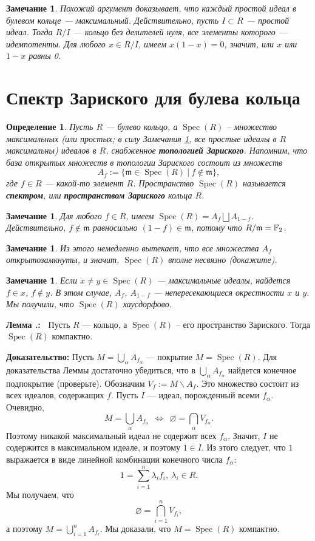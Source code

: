 \documentclass[12pt]{book}
\def\endproof{\hbox{\vrule width 5pt height 5pt depth 0pt}}
\renewcommand{\emptyset}{\varnothing}
\newcommand{\Spec}{\operatorname{Spec}}
\theoremstyle{upshape}
\newtheorem{zadacha}{Задача}[chapter]
\theoremstyle{generic}
\newtheorem{opredelenie}[teorema]{Определение}
\newtheorem{remark}[teorema]{Замечание}
\def\замечание{\begin{remark}}
\def\еза{\end{remark}}
\theoremstyle{upshapenonumber}
\newcommand{\следствие}{%
     \refstepcounter{teorema}
     {\noindent\bf Следствие \thechapter.\arabic{teorema}:\ }}
\newcommand{\пример}{%
     \refstepcounter{teorema}
     {\noindent\bf Пример \thechapter.\arabic{teorema}:\ }}
\newcommand{\лемма}{%
     \refstepcounter{teorema}
     {\noindent\bf Лемма \thechapter.\arabic{teorema}:\ }}
\newcommand{\теорема}{%
     \refstepcounter{teorema}
     {\noindent\bf Теорема \thechapter.\arabic{teorema}:\ }}
\newcommand{\утверждение}{%
     \refstepcounter{teorema}
     {\noindent\bf Утверждение \thechapter.\arabic{teorema}:\ }}
\def\хфилл{\hfill}
\def\ноиндент{\noindent}
\def\бф{\bf}
\def\ем{\em}
\def\задача{\begin{zadacha}}
\def\ез{\end{zadacha}}
\def\еу{\end{ukazanie}}
\def\определение{\begin{opredelenie}}
\def\ео{\end{opredelenie}}
\def\goth{\mathfrak}
\def\енум{\begin{enumerate}}
\def\ее{\end{enumerate}}
\begin{document}
\замечание\label{_prostye_maks_v_bul_Zamechanie_}
Похожий аргумент доказывает, что 
каждый простой идеал в булевом кольце --- максимальный.
Действительно, пусть $I\subset R$ --- простой идеал.
Тогда $R/I$ --- кольцо без делителей нуля, все элементы
которого --- идемпотенты. Для любого $x \in R/I$,
имеем $x(1-x)=0$, значит, или $x$ или $1-x$ равны 0.
\еза


\section{Спектр Зариского для булева кольца}


\определение
Пусть $R$ --- булево кольцо, а $\Spec(R)$ --
множество максимальных (или простых; в силу 
Замечания \ref{_prostye_maks_v_bul_Zamechanie_},
все простые идеалы в $R$ максимальны) идеалов 
в $R$, снабженное {\бф топологией Зариского}.
Напомним, что база открытых множеств в топологии
Зариского состоит из множеств 
\[
  A_f:= \{{\goth m}\in \Spec(R) \ | \ f \notin {\goth m}\},
\]
где  $f \in R$ --- какой-то элемент $R$. Пространство
$\Spec(R)$ называется {\бф спектром}, или
{\бф пространством Зариского} кольца $R$.
\ео

\замечание \label{_A_f_coprod_A_1-f_Zamechanie_}
Для любого $f\in R$, имеем
$\Spec(R)= A_f \bigsqcup A_{1-f}$.
Действительно,  $f\notin {\goth m}$
равносильно $(1-f)\in {\goth m}$, потому что
$R/{\goth m}= {\Bbb F}_2$.
\еза

\замечание
Из этого немедленно вытекает, что
все множества $A_f$ открытозамкнуты, и
значит, $\Spec(R)$ вполне несвязно
(докажите).
\еза

\замечание
Если $x\neq y\in \Spec(R)$ --- максимальные идеалы,
найдется $f \in x$, $f\notin y$. В этом случае,
$A_f$, $A_{1-f}$ --- непересекающиеся окрестности
$x$ и $y$. Мы получили, что $\Spec(R)$
хаусдорфово.
\еза 


\лемма
Пусть $R$ --- кольцо, а $\Spec(R)$ --
его пространство Зариского. Тогда $\Spec(R)$
компактно.

\хфилл

\ноиндент
{\бф Доказательство:} Пусть $M = \bigcup_\alpha A_{f_\alpha}$ --- покрытие
$M=\Spec(R)$. Для доказательства Леммы достаточно убедиться,
что в $\bigcup_\alpha A_{f_\alpha}$ найдется конечное подпокрытие
(проверьте). 
Обозначим $V_{f}:= M \backslash A_{f}$.
Это множество состоит из всех идеалов, содержащих $f$.
Пусть $I$ --- идеал, порожденный всеми $f_\alpha$.
Очевидно,
\[
M = \bigcup_\alpha A_{f_\alpha}  \ \  \Leftrightarrow \ \ \emptyset 
= \bigcap_\alpha V_{f_\alpha}.
\]
 Поэтому никакой максимальный 
идеал не содержит всех $f_\alpha$. Значит, $I$ не содержится
в максимальном идеале, и поэтому $1\in I$. Из этого следует, что
$1$ выражается в виде линейной комбинации конечного
числа $f_\alpha$:
\[
1 = \sum_{i=1}^n \lambda_i f_i, \ \lambda_i \in R.
\]
Мы получаем, что 
\[ \emptyset = \bigcap_{i=1}^n V_{f_i},\]
а поэтому $M=\bigcup_{i=1}^n A_{f_i}$.
Мы доказали, что $M=\Spec(R)$ компактно. \endproof
\end{document}
